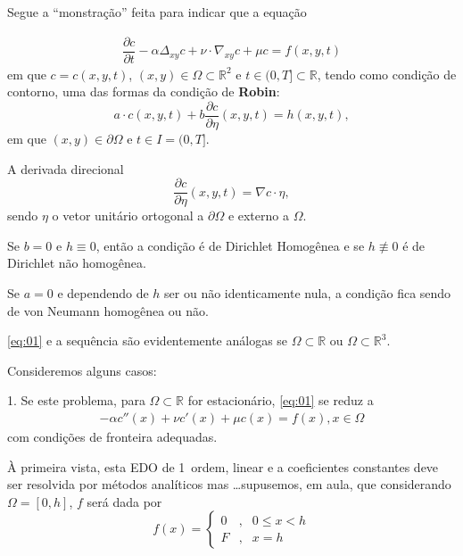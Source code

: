 
Segue a ``monstração'' feita para indicar que a equação

\begin{eqnarray}\label{eq:01}
\dfrac{\partial c}{\partial t} - \alpha \Delta_{xy} c + \nu \cdot \nabla_{xy} c + \mu c = f(x,y,t)
\end{eqnarray}
em que \(c = c(x,y,t)\), \((x,y) \in \Omega \subset \mathbb{R}^2\) e \(t \in (0, T] \subset \mathbb{R}\), tendo como condição de contorno, uma das formas da condição de \textbf{Robin}:
\begin{equation}
a \cdot c(x,y,t) + b \dfrac{\partial c}{\partial \eta} (x,y,t) = h(x,y,t),
\end{equation}
em que \((x,y) \in \partial\Omega\) e \(t \in I = (0, T]\).

A derivada direcional
\[\dfrac{\partial c}{\partial \eta}(x,y,t) = \nabla c \cdot \eta,\]
sendo \(\eta\) o vetor unitário ortogonal a \(\partial \Omega\) e externo a \(\Omega\).

\begin{remark}
Se \(b=0\) e \(h \equiv 0\), então a condição é de Dirichlet Homogênea e se \(h \not\equiv 0\) é de Dirichlet não homogênea.
\end{remark}

\begin{remark}
Se \(a=0\) e dependendo de \(h\) ser ou não identicamente nula, a condição fica sendo de von Neumann homogênea ou não.
\end{remark}

\begin{remark}
\eqref{eq:01} e a sequência são evidentemente análogas se \(\Omega \subset \mathbb{R}\) ou \(\Omega \subset \mathbb{R}^3\).
\end{remark}


Consideremos alguns casos:

1.  Se este problema, para \(\Omega \subset \mathbb{R}\) for estacionário, \eqref{eq:01} se reduz a
\begin{eqnarray}\label{eq:02}
- \alpha c''(x) + \nu c'(x) + \mu c(x) = f(x), x \in \Omega
\end{eqnarray}
com condições de fronteira adequadas.

À primeira vista, esta EDO de 1\textordfeminine\ ordem, linear e a coeficientes constantes deve ser resolvida por métodos analíticos mas \ldots supusemos, em aula, que considerando \(\Omega = [0, h]\), \(f\) será dada por
\[f(x) = \left\{\begin{array}{rcl}
0 &,& 0 \le x < h \\
F &,& x = h
\end{array}\right.\]

